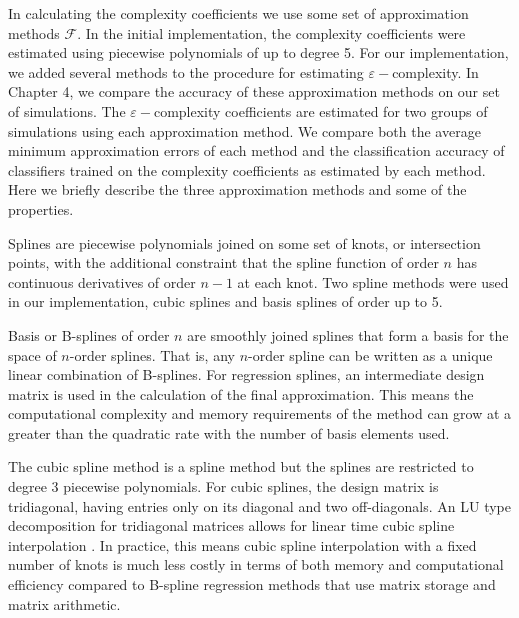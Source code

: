 In calculating the complexity coefficients we use some set 
of approximation methods $\mathcal{F}$.
In the initial implementation, the complexity coefficients were estimated using piecewise polynomials of
up to degree 5. 
For our implementation, we added several methods to the procedure for estimating $\varepsilon-$complexity. 
In Chapter 4, we compare the accuracy of these 
approximation methods on our set of simulations.
The $\varepsilon-$complexity coefficients are estimated
for two groups of simulations using each approximation
method. We compare both the average minimum approximation errors of each method and the classification accuracy of classifiers trained 
on the complexity coefficients as estimated by each method. Here 
we briefly describe the three approximation methods and some of the
properties.

Splines are piecewise polynomials joined on some set of knots, or intersection points, with the additional constraint that the spline function of order $n$ has continuous derivatives of order
$n-1$ at each knot. Two spline methods were used in our implementation, cubic splines and basis splines of order up to 5.

Basis or B-splines of order $n$ are smoothly joined splines that form a basis for the space of $n$-order splines. That is, any $n$-order spline can be written as a unique linear combination of B-splines. For regression splines, an intermediate
design matrix is used in the calculation of the final approximation. 
This means the computational complexity and memory requirements of the method can grow at a greater than the quadratic rate with the number of basis elements used. 

The cubic spline method is a spline method but the
splines are restricted to degree 3 piecewise polynomials. For cubic splines, the design matrix is tridiagonal, having entries only on its diagonal and two off-diagonals. An LU type decomposition for tridiagonal matrices allows for linear time cubic spline interpolation \cite{dahlquist08}. In practice, this means cubic spline interpolation with a fixed number of knots is much less costly in terms of both memory and computational efficiency compared to B-spline regression methods that use
matrix storage and matrix arithmetic.


